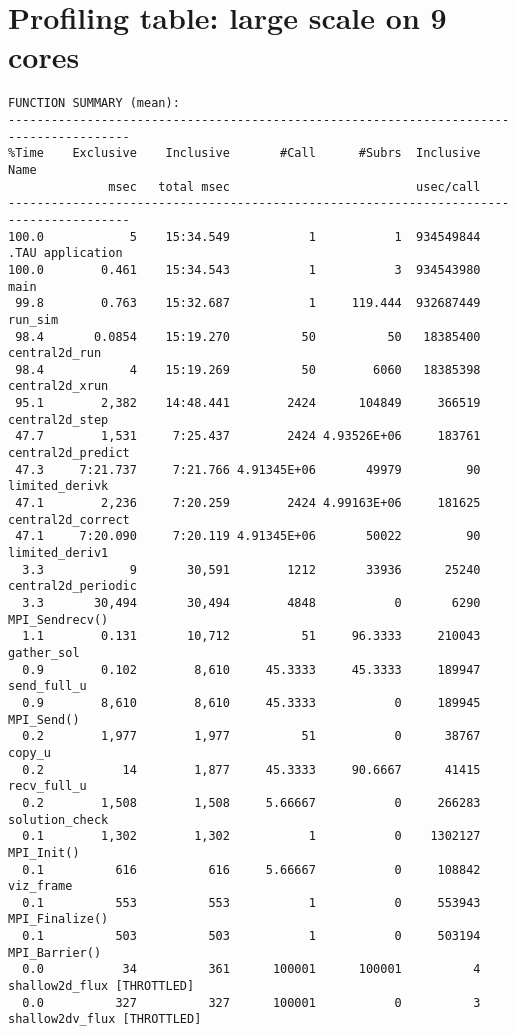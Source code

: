 \documentclass{article}
\begin{document}
\section{Profiling table: large scale on 9 cores}
\noindent
{\footnotesize
\begin{verbatim}
FUNCTION SUMMARY (mean):
---------------------------------------------------------------------------------------
%Time    Exclusive    Inclusive       #Call      #Subrs  Inclusive Name
              msec   total msec                          usec/call 
---------------------------------------------------------------------------------------
100.0            5    15:34.549           1           1  934549844 .TAU application
100.0        0.461    15:34.543           1           3  934543980 main 
 99.8        0.763    15:32.687           1     119.444  932687449 run_sim 
 98.4       0.0854    15:19.270          50          50   18385400 central2d_run 
 98.4            4    15:19.269          50        6060   18385398 central2d_xrun 
 95.1        2,382    14:48.441        2424      104849     366519 central2d_step 
 47.7        1,531     7:25.437        2424 4.93526E+06     183761 central2d_predict 
 47.3     7:21.737     7:21.766 4.91345E+06       49979         90 limited_derivk 
 47.1        2,236     7:20.259        2424 4.99163E+06     181625 central2d_correct 
 47.1     7:20.090     7:20.119 4.91345E+06       50022         90 limited_deriv1 
  3.3            9       30,591        1212       33936      25240 central2d_periodic 
  3.3       30,494       30,494        4848           0       6290 MPI_Sendrecv() 
  1.1        0.131       10,712          51     96.3333     210043 gather_sol 
  0.9        0.102        8,610     45.3333     45.3333     189947 send_full_u 
  0.9        8,610        8,610     45.3333           0     189945 MPI_Send() 
  0.2        1,977        1,977          51           0      38767 copy_u 
  0.2           14        1,877     45.3333     90.6667      41415 recv_full_u 
  0.2        1,508        1,508     5.66667           0     266283 solution_check 
  0.1        1,302        1,302           1           0    1302127 MPI_Init() 
  0.1          616          616     5.66667           0     108842 viz_frame 
  0.1          553          553           1           0     553943 MPI_Finalize() 
  0.1          503          503           1           0     503194 MPI_Barrier() 
  0.0           34          361      100001      100001          4 shallow2d_flux [THROTTLED]
  0.0          327          327      100001           0          3 shallow2dv_flux [THROTTLED]

\end{verbatim}}
\end{document}
